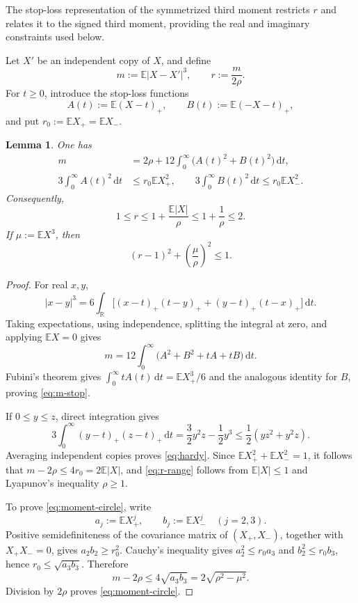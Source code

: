 \documentclass[11pt]{article}
\newtheorem{lemma}[theorem]{Lemma}
\newcommand{\E}{\mathbb E}
\newcommand{\R}{\mathbb R}
\newcommand{\dd}{\,\mathrm d}
\newcommand{\abs}[1]{\lvert#1\rvert}
\begin{document}
The stop-loss representation of the symmetrized third moment restricts \(r\) and relates
it to the signed third moment, providing the real and imaginary constraints
used below.

Let \(X'\) be an independent copy of \(X\), and define
\[
 m:=\E\abs{X-X'}^3,\qquad r:=\frac{m}{2\rho}.
\]
For \(t\ge0\), introduce the stop-loss functions
\[
 A(t):=\E(X-t)_+,\qquad B(t):=\E(-X-t)_+,
\]
and put \(r_0:=\E X_+=\E X_-\).

\begin{lemma}\label{lem:stoploss}
One has
\begin{align}
 m&=2\rho+12\int_0^\infty\bigl(A(t)^2+B(t)^2\bigr)\dd t,
 \label{eq:m-stop}\tag{2.1}\\
 3\int_0^\infty A(t)^2\dd t&\le r_0\E X_+^2,
 \qquad
 3\int_0^\infty B(t)^2\dd t\le r_0\E X_-^2.
 \label{eq:hardy}\tag{2.2}
\end{align}
Consequently,
\[
 1\le r\le1+\frac{\E\abs X}{\rho}
 \le1+\frac1\rho\le2.
 \label{eq:r-range}\tag{2.3}
\]
If \(\mu:=\E X^3\), then
\[
 (r-1)^2+\left(\frac\mu\rho\right)^2\le1.
 \label{eq:moment-circle}\tag{2.4}
\]
\end{lemma}

\begin{proof}
For real \(x,y\),
\[
 \abs{x-y}^3=6\int_{\R}
 \bigl[(x-t)_+(t-y)_+ +(y-t)_+(t-x)_+\bigr]\dd t.
\]
Taking expectations, using independence, splitting the integral at zero,
and applying \(\E X=0\) gives
\[
 m=12\int_0^\infty\bigl(A^2+B^2+tA+tB\bigr)\dd t.
\]
Fubini's theorem gives
\(\int_0^\infty tA(t)\dd t=\E X_+^3/6\) and the analogous identity
for \(B\), proving \eqref{eq:m-stop}.

If \(0\le y\le z\), direct integration gives
\[
 3\int_0^\infty(y-t)_+(z-t)_+\dd t
 =\frac32y^2z-\frac12y^3
 \le\frac12(yz^2+y^2z).
\]
Averaging independent copies proves \eqref{eq:hardy}.  Since
\(\E X_+^2+\E X_-^2=1\), it follows that
\(m-2\rho\le4r_0=2\E\abs X\), and \eqref{eq:r-range} follows from
\(\E\abs X\le1\) and Lyapunov's inequality \(\rho\ge1\).

To prove \eqref{eq:moment-circle}, write
\[
 a_j:=\E X_+^j,\qquad b_j:=\E X_-^j\quad(j=2,3).
\]
Positive semidefiniteness of the covariance matrix of \((X_+,X_-)\),
together with \(X_+X_-=0\), gives \(a_2b_2\ge r_0^2\).
Cauchy's inequality gives \(a_2^2\le r_0a_3\) and
\(b_2^2\le r_0b_3\), hence \(r_0\le\sqrt{a_3b_3}\).  Therefore
\[
 m-2\rho\le4\sqrt{a_3b_3}
 =2\sqrt{\rho^2-\mu^2}.
\]
Division by \(2\rho\) proves \eqref{eq:moment-circle}.
\end{proof}
\end{document}
